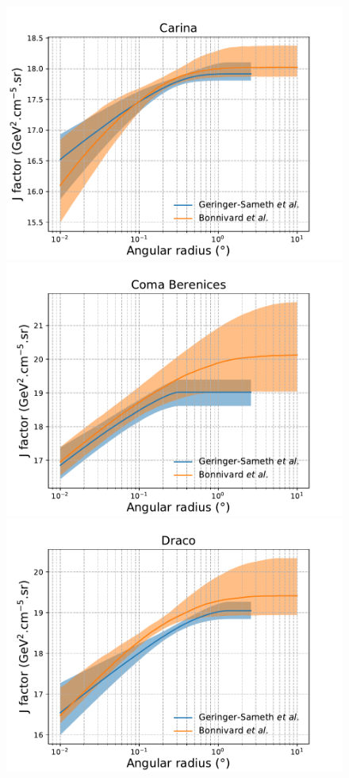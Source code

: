 \begin{figure}[ht]
{    \includegraphics[scale=0.32]{figures/glory_duck/appendix/Carina.pdf}
    \includegraphics[scale=0.32]{figures/glory_duck/appendix/ComaBerenices.pdf}
    \includegraphics[scale=0.32]{figures/glory_duck/appendix/Draco.pdf}
}
\end{figure}
